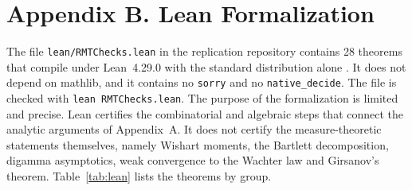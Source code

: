 \section*{Appendix B. Lean Formalization}

The file \texttt{lean/RMTChecks.lean} in the replication repository contains 28 theorems that compile under Lean~4.29.0 with the standard distribution alone \citep{demoura2021lean}. It does not depend on mathlib, and it contains no \texttt{sorry} and no \texttt{native\_decide}. The file is checked with \texttt{lean RMTChecks.lean}. The purpose of the formalization is limited and precise. Lean certifies the combinatorial and algebraic steps that connect the analytic arguments of Appendix~A. It does not certify the measure-theoretic statements themselves, namely Wishart moments, the Bartlett decomposition, digamma asymptotics, weak convergence to the Wachter law and Girsanov's theorem. Table~\ref{tab:lean} lists the theorems by group.

